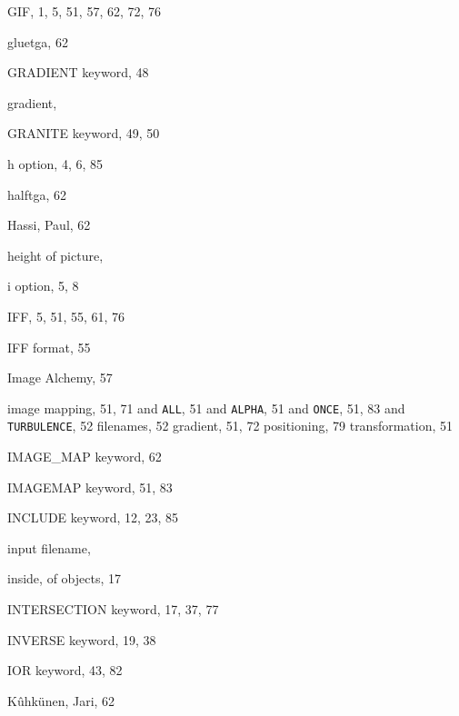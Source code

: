\begin{theindex}
  \indexspace

  \item GIF, 1, 5, 51, 57, 62, 72, 76
  \item {\ptt gluetga}, 62
  \item {\ptt GRADIENT} keyword, 48
  \item gradient, 
  \item {\ptt GRANITE} keyword, 49, 50

  \indexspace

  \item {\ptt h} option, 4, 6, 85
  \item {\ptt halftga}, 62
  \item Hassi, Paul, 62
  \item height of picture, 

  \indexspace

  \item {\ptt i} option, 5, 8
  \item IFF, 5, 51, 55, 61, 76
  \item IFF format, 55
  \item {\pem {}Image Alchemy}, 57
  \item image mapping, 51, 71
    \subitem and {\tt ALL}, 51
    \subitem and {\tt ALPHA}, 51
    \subitem and {\tt ONCE}, 51, 83
    \subitem and {\tt TURBULENCE}, 52
    \subitem filenames, 52
    \subitem gradient, 51, 72
    \subitem positioning, 79
    \subitem transformation, 51
  \item {\ptt IMAGE\_MAP} keyword, 62
  \item {\ptt IMAGEMAP} keyword, 51, 83
  \item {\ptt INCLUDE} keyword, 12, 23, 85
  \item input filename, 
  \item inside, of objects, 17
  \item {\ptt INTERSECTION} keyword, 17, 37, 77
  \item {\ptt INVERSE} keyword, 19, 38
  \item {\ptt IOR} keyword, 43, 82

  \indexspace

  \item K\^{u}hk\"{u}nen, Jari, 62

  \indexspace


\end{theindex}
